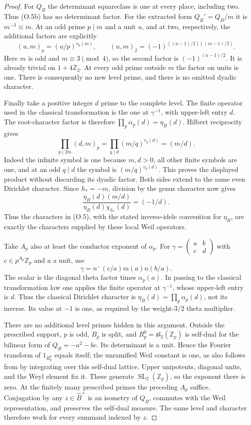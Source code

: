 \documentclass[11pt]{article}
\theoremstyle{definition}
\theoremstyle{remark}
\begin{document}
\begin{proof}
For $Q_B$ the determinant squareclass is one at every place,
including two. Thus (O.5b) has no determinant factor. For the
extracted form $Q_B'=Q_B/m$ it is $m^{-3}\equiv m$.
At an odd prime $p\mid m$ and a unit $u$, and at two, respectively,
the additional factors are explicitly
\[
 (u,m)_p=(u/p)^{v_p(m)},\qquad
 (u,m)_2=(-1)^{((u-1)/2)((m-1)/2)}.
\]
Here $m$ is odd and $m\equiv3\pmod4$, so the second factor is
$(-1)^{(u-1)/2}$. It is already trivial on $1+4\mathbb Z_2$.
At every odd prime outside $m$ the factor on units is one. There
is consequently no new level prime, and there is no omitted
dyadic character.

Finally take a positive integer $d$ prime to the complete level.
The finite operator used in the classical transformation is the
one at $\gamma^{-1}$, with upper-left entry $d$. The root-character
factor is therefore $\prod_p\alpha_p(d)=\eta_B(d)$.
Hilbert reciprocity gives
\[
 \prod_{p\mid 2m}(d,m)_p
   =\prod_{q\mid d}(m/q)^{v_q(d)}=(m/d).                       \tag{O.5c}
\]
Indeed the infinite symbol is one because $m,d>0$, all other
finite symbols are one, and at an odd $q\mid d$ the symbol is
$(m/q)^{v_q(d)}$. This proves the displayed product without
discarding its dyadic factor. Both sides extend to the same
even Dirichlet character. Since $h_*=-m$, division by the genus
character now gives
\[
 \frac{\eta_B(d)(m/d)}{\eta_B(d)\chi_{h_*}(d)}=(-1/d).
\]
Thus the characters in (O.5), with the stated inverse-idele
convention for $\eta_B$, are exactly the characters supplied
by these local Weil operators.

Take $A_p$ also at least the conductor exponent of $\alpha_p$.
For $\gamma=\left(\begin{smallmatrix}a&b\\c&d\end{smallmatrix}\right)$
with $c\in p^{A_p}\mathbb Z_p$ and $a$ a unit, use
\[
 \gamma=n^-(c/a)m(a)n(b/a).
\]
The scalar is the diagonal theta factor times $\alpha_p(a)$.
In passing to the classical transformation law one applies the
finite operator at $\gamma^{-1}$, whose upper-left entry is $d$.
Thus the classical Dirichlet character is
$\eta_B(d)=\prod_p\alpha_p(d)$, not its inverse.  Its value at
$-1$ is one, as required by the weight-$3/2$ theta multiplier.

There are no additional level primes hidden in this argument.
Outside the prescribed support, $p$ is odd, $B_p$ is split, and
$R_p^0=\mathfrak{sl}_2(\mathbb Z_p)$ is self-dual for the bilinear
form of $Q_B=-a^2-bc$.  Its determinant is a unit.  Hence the
Fourier transform of $1_{R_p^0}$ equals itself; the unramified
Weil constant is one, as also follows from \cite[II.27]{weil} by integrating
over this self-dual lattice.  Upper unipotents, diagonal units,
and the Weyl element fix it.  These generate
$\operatorname{SL}_2(\mathbb Z_p)$, so the exponent there is zero.
At the finitely many prescribed primes the preceding $A_p$ suffice.
Conjugation by any $z\in\widehat B^\times$ is an isometry of $Q_B$,
commutes with the Weil representation, and preserves the
self-dual measure.  The same level and character therefore work
for every summand indexed by $z$.


\end{proof}
\end{document}
